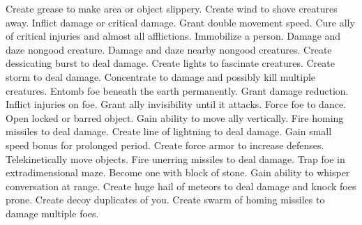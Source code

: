     {Create grease to make area or object slippery.}
    {Create wind to shove creatures away.}
    {Inflict damage or critical damage.}
    {Grant double movement speed.}
    {Cure ally of critical injuries and almost all afflictions.}
    {Immobilize a person.}
    {Damage and daze nongood creature.}
    {Damage and daze nearby nongood creatures.}
    {Create dessicating burst to deal damage.}
    {Create lights to fascinate creatures.}
    {Create storm to deal damage.}
    {Concentrate to damage and possibly kill multiple creatures.}
    {Entomb foe beneath the earth permanently.}
    {Grant damage reduction.}
    {Inflict injuries on foe.}
    {Grant ally invisibility until it attacks.}
    {Force foe to dance.}
    {Open locked or barred object.}
    {Gain ability to move ally vertically.}
    {Fire homing missiles to deal damage.}
    {Create line of lightning to deal damage.}
    {Gain small speed bonus for prolonged period.}
    {Create force armor to increase defenses.}
    {Telekinetically move objects.}
    {Fire unerring missiles to deal damage.}
    {Trap foe in extradimensional maze.}
    {Become one with block of stone.}
    {Gain ability to whisper conversation at range.}
    {Create huge hail of meteors to deal damage and knock foes prone.}
    {Create decoy duplicates of you.}
    {Create swarm of homing missiles to damage multiple foes.}
